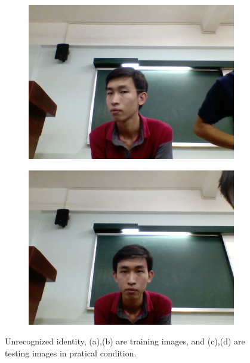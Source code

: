 \documentclass[journal, twocolumn]{IEEEtran}
\begin{document}
\begin{figure}[h!]
\begin{subfigure}[b]{0.35\linewidth}
    \includegraphics[width=\linewidth]{img/3.png}
    \caption{}
  \end{subfigure}
    \begin{subfigure}[b]{0.35\linewidth}
    \includegraphics[width=\linewidth]{img/4.png}
    \caption{}
  \end{subfigure}
  \caption{Unrecognized identity, (a),(b) are training images, and (c),(d) are testing images in pratical condition.} 
  \label{fig:compare}
\end{figure}


\medskip
\end{document}

